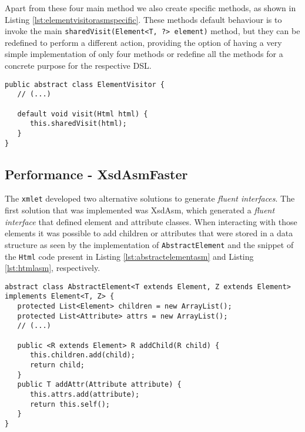 \noindent
Apart from these four main method we also create specific methods, as shown in Listing \ref{lst:elementvisitorasmspecific}. These methods default behaviour is to invoke the main \texttt{sharedVisit(Element<T, ?> element)} method, but they can be redefined to perform a different action, providing the option of having a very simple implementation of only four methods or redefine all the methods for a concrete purpose for the respective \ac{DSL}.

\bigskip


\begin{minipage}{\linewidth}
\begin{lstlisting}[caption={ElementVisitor Generated by XsdAsm - The Specific Methods},label={lst:elementvisitorasmspecific}]
public abstract class ElementVisitor {
   // (...)

   default void visit(Html html) {
      this.sharedVisit(html);
   }
}
\end{lstlisting}
\end{minipage}

\subsection{Performance - XsdAsmFaster}
\label{sec:xsdasmfaster}

The \texttt{xmlet} developed two alternative solutions to generate \textit{fluent interfaces}. The first solution that was implemented was XsdAsm, which generated a \textit{fluent interface} that defined element and attribute classes. When interacting with those elements it was possible to add children or attributes that were stored in a data structure as seen by the implementation of \texttt{AbstractElement} and the snippet of the \texttt{Html} code present in Listing \ref{lst:abstractelementasm} and Listing \ref{lst:htmlasm}, respectively.

\bigskip


\begin{minipage}{\linewidth}
\begin{lstlisting}[caption={AbstractElement Class Generated by XsdAsm},label={lst:abstractelementasm}]
abstract class AbstractElement<T extends Element, Z extends Element> implements Element<T, Z> {
   protected List<Element> children = new ArrayList();
   protected List<Attribute> attrs = new ArrayList();
   // (...)

   public <R extends Element> R addChild(R child) {
      this.children.add(child);
      return child;
   }
   public T addAttr(Attribute attribute) {
      this.attrs.add(attribute);
      return this.self();
   }
}
\end{lstlisting}
\end{minipage}

